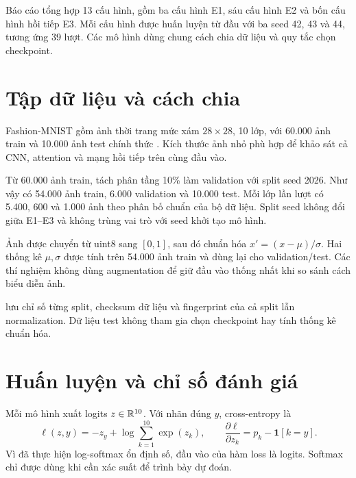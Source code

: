 \documentclass[12pt,a4paper]{report}
\begin{document}
Báo cáo tổng hợp 13 cấu hình, gồm ba cấu hình E1, sáu cấu hình E2 và bốn cấu hình hồi tiếp E3. Mỗi cấu hình được huấn luyện từ đầu với ba seed 42, 43 và 44, tương ứng 39 lượt. Các mô hình dùng chung cách chia dữ liệu và quy tắc chọn checkpoint.

\section{Tập dữ liệu và cách chia}
Fashion-MNIST gồm ảnh thời trang mức xám $28\times28$, 10 lớp, với 60.000 ảnh train và 10.000 ảnh test chính thức \cite{fashion}. Kích thước ảnh nhỏ phù hợp để khảo sát cả CNN, attention và mạng hồi tiếp trên cùng đầu vào.

Từ 60.000 ảnh train, tách phân tầng 10\% làm validation với split seed 2026. Như vậy có 54.000 ảnh train, 6.000 validation và 10.000 test. Mỗi lớp lần lượt có 5.400, 600 và 1.000 ảnh theo phân bố chuẩn của bộ dữ liệu. Split seed không đổi giữa E1–E3 và không trùng vai trò với seed khởi tạo mô hình.

Ảnh được chuyển từ uint8 sang $[0,1]$, sau đó chuẩn hóa $x'=(x-\mu)/\sigma$. Hai thống kê $\mu,\sigma$ được tính trên 54.000 ảnh train và dùng lại cho validation/test. Các thí nghiệm không dùng augmentation để giữ đầu vào thống nhất khi so sánh cách biểu diễn ảnh.

 lưu chỉ số từng split, checksum dữ liệu và fingerprint của cả split lẫn normalization. Dữ liệu test không tham gia chọn checkpoint hay tính thống kê chuẩn hóa.

\section{Huấn luyện và chỉ số đánh giá}
Mỗi mô hình xuất logits $z\in\mathbb{R}^{10}$. Với nhãn đúng $y$, cross-entropy là
\begin{equation}
\ell(z,y)=-z_y+\log\sum_{k=1}^{10}\exp(z_k),
\qquad \frac{\partial\ell}{\partial z_k}=p_k-\mathbf{1}[k=y].
\end{equation}
Vì  đã thực hiện log-softmax ổn định số, đầu vào của hàm loss là logits. Softmax chỉ được dùng khi cần xác suất để trình bày dự đoán.
\end{document}

